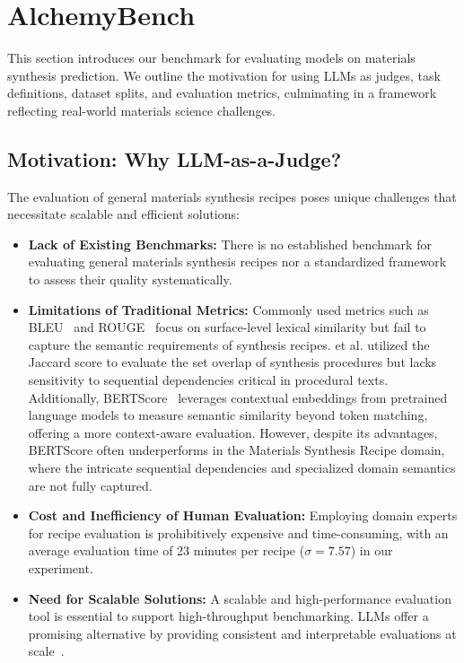 \section{AlchemyBench}
\label{sec:benchmark}

This section introduces our benchmark for evaluating models on materials synthesis prediction. We outline the motivation for using LLMs as judges, task definitions, dataset splits, and evaluation metrics, culminating in a framework reflecting real-world materials science challenges.

\subsection{Motivation: Why LLM-as-a-Judge?}
\label{subsec:motivation}
The evaluation of general materials synthesis recipes poses unique challenges that necessitate scalable and efficient solutions:
\begin{itemize}
    \item \textbf{Lack of Existing Benchmarks:} There is no established benchmark for evaluating general materials synthesis recipes nor a standardized framework to assess their quality systematically.
    \item \textbf{Limitations of Traditional Metrics:} Commonly used metrics such as BLEU~\cite{papineni2002bleu} and ROUGE~\cite{lin2004rouge} focus on surface-level lexical similarity but fail to capture the semantic requirements of synthesis recipes. \citeauthor{na2023artificial} et al. utilized the Jaccard score to evaluate the set overlap of synthesis procedures but lacks sensitivity to sequential dependencies critical in procedural texts. Additionally, BERTScore~\cite{zhang2019bertscore} leverages contextual embeddings from pretrained language models to measure semantic similarity beyond token matching, offering a more context-aware evaluation. However, despite its advantages, BERTScore often underperforms in the Materials Synthesis Recipe domain, where the intricate sequential dependencies and specialized domain semantics are not fully captured.
    \item \textbf{Cost and Inefficiency of Human Evaluation:} Employing domain experts for recipe evaluation is prohibitively expensive and time-consuming, with an average evaluation time of 23 minutes per recipe ($\sigma=7.57$) in our experiment.
    \item \textbf{Need for Scalable Solutions:} A scalable and high-performance evaluation tool is essential to support high-throughput benchmarking. LLMs offer a promising alternative by providing consistent and interpretable evaluations at scale~\cite{gu2025surveyllmasajudge}.
\end{itemize}

